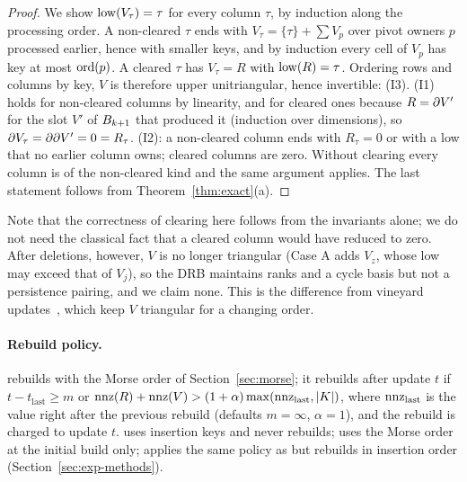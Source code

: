 \begin{proof}
We show $\operatorname{low}(V_\tau)=\tau$ for every column $\tau$, by induction along the
processing order. A non-cleared $\tau$ ends with
$V_\tau=\{\tau\}+\sum V_p$ over pivot owners $p$ processed earlier, hence with
smaller keys, and by induction every cell of $V_p$ has key at most $\operatorname{ord}(p)$. A
cleared $\tau$ has $V_\tau=R$ with $\operatorname{low}(R)=\tau$. Ordering rows and columns by
key, $V$ is therefore upper unitriangular, hence invertible: (I3). (I1) holds
for non-cleared columns by linearity, and for cleared ones because $R=\partial V'$
for the slot $V'$ of $B_{k+1}$ that produced it (induction over dimensions), so
$\partial V_\tau=\partial\partial V'=0=R_\tau$. (I2): a non-cleared column ends with $R_\tau=0$ or
with a low that no earlier column owns; cleared columns are zero. Without
clearing every column is of the non-cleared kind and the same argument applies.
The last statement follows from Theorem~\ref{thm:exact}(a).
\end{proof}

Note that the correctness of clearing here follows from the invariants alone;
we do not need the classical fact that a cleared column would have reduced to
zero. After deletions, however, $V$ is no longer triangular (Case A adds
$V_z$, whose low may exceed that of $V_j$), so the DRB maintains ranks and a cycle
basis but not a persistence pairing, and we claim none. This is the difference
from vineyard updates~\cite{cohensteiner2006vines}, which keep $V$ triangular
for a changing order.

\paragraph{Rebuild policy.}  rebuilds with the Morse order of Section~\ref{sec:morse}; it
rebuilds after update $t$ if $t-t_{\mathrm{last}}\ge m$ or
$\operatorname{nnz}(R)+\operatorname{nnz}(V)>(1+\alpha)\max(\operatorname{nnz}_{\mathrm{last}},|K|)$, where
$\operatorname{nnz}_{\mathrm{last}}$ is the value right after the previous rebuild (defaults
$m=\infty$, $\alpha=1$), and the rebuild is charged to update $t$.
 uses insertion keys and never rebuilds;  uses
the Morse order at the initial build only;  applies the same
policy as  but rebuilds in insertion order
(Section~\ref{sec:exp-methods}).
